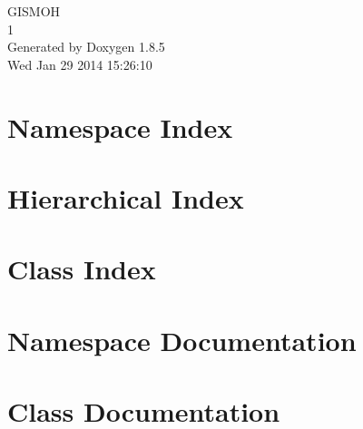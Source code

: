 \documentclass[twoside]{book}
\newcommand{\clearemptydoublepage}{%
  \newpage{\pagestyle{empty}\cleardoublepage}%
}
\begin{document}
\hypersetup{pageanchor=false}
\begin{titlepage}
\vspace*{7cm}
\begin{center}%
{\Large G\-I\-S\-M\-O\-H \\[1ex]\large 1 }\\
\vspace*{1cm}
{\large Generated by Doxygen 1.8.5}\\
\vspace*{0.5cm}
{\small Wed Jan 29 2014 15:26:10}\\
\end{center}
\end{titlepage}
\clearemptydoublepage
\tableofcontents
\clearemptydoublepage
{}
\hypersetup{pageanchor=true}

\chapter{Namespace Index}

\chapter{Hierarchical Index}

\chapter{Class Index}

\chapter{Namespace Documentation}




\chapter{Class Documentation}

























\newpage
{}
{}
\printindex
\end{document}
